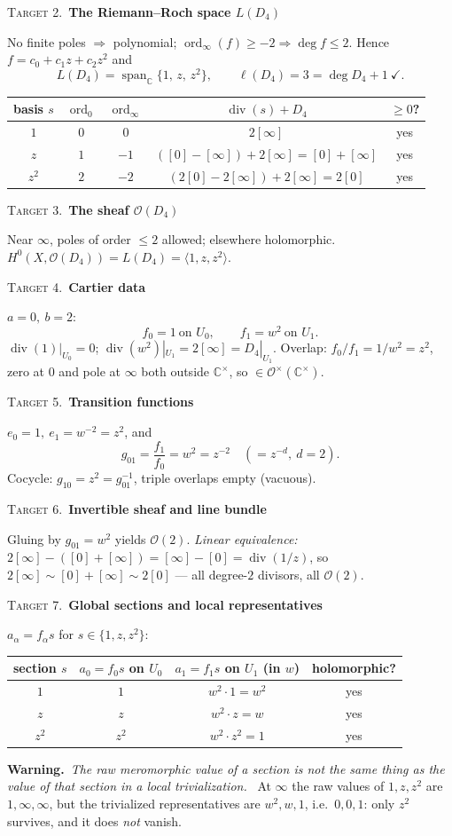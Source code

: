 \documentclass[11pt]{article}
\newcommand{\CC}{\mathbb C}
\newcommand{\OO}{\mathcal O}
\newcommand{\divisor}{\operatorname{div}}
\newcommand{\ord}{\operatorname{ord}}
\newcommand{\Span}{\operatorname{span}}
\newcommand{\target}[2]{\medskip\noindent%
  {\small\textsc{\textcolor{accent}{Target #1.}}}\ \textbf{\textcolor{inkblue}{#2}}\par\nopagebreak\smallskip}
\newcommand{\warningnote}{\par\smallskip\noindent%
  {\color{polered}\textbf{Warning.}}\ \emph{The raw meromorphic value of a section
  is not the same thing as the value of that section in a local trivialization.}\ }
\theoremstyle{plain}
\theoremstyle{definition}
\begin{document}
\target{2}{The Riemann--Roch space \(L(D_4)\)}
No finite poles $\Rightarrow$ polynomial; $\ord_\infty(f)\ge-2\Rightarrow\deg
f\le2$. Hence $f=c_0+c_1z+c_2z^2$ and
\[
  L(D_4)=\Span_\CC\{1,\,z,\,z^2\},\qquad \ell(D_4)=3=\deg D_4+1\ \checkmark.
\]
\begin{center}\small
\begin{tabular}{ccccc}
\toprule
basis $s$ & $\ord_0$ & $\ord_\infty$ & $\divisor(s)+D_4$ & $\ge0$?\\
\midrule
$1$   & $0$ & $0$  & $2[\infty]$                       & yes\\
$z$   & $1$ & $-1$ & $([0]-[\infty])+2[\infty]=[0]+[\infty]$ & yes\\
$z^2$ & $2$ & $-2$ & $(2[0]-2[\infty])+2[\infty]=2[0]$ & yes\\
\bottomrule
\end{tabular}
\end{center}

\target{3}{The sheaf \(\OO(D_4)\)}
Near $\infty$, poles of order $\le2$ allowed; elsewhere holomorphic.
$H^0(X,\OO(D_4))=L(D_4)=\langle1,z,z^2\rangle$.

\target{4}{Cartier data}
$a=0,\ b=2$:
\[
  f_0=1\ \text{on }U_0,\qquad f_1=w^{2}\ \text{on }U_1 .
\]
$\divisor(1)|_{U_0}=0$; $\divisor(w^2)|_{U_1}=2[\infty]=D_4|_{U_1}$. Overlap:
$f_0/f_1=1/w^2=z^2$, zero at $0$ and pole at $\infty$ both outside $\CC^\times$,
so $\in\OO^\times(\CC^\times)$.

\target{5}{Transition functions}
$e_0=1,\ e_1=w^{-2}=z^2$, and
\[
  g_{01}=\frac{f_1}{f_0}=w^{2}=z^{-2}\quad(=z^{-d},\ d=2).
\]
Cocycle: $g_{10}=z^2=g_{01}^{-1}$, triple overlaps empty (vacuous).

\target{6}{Invertible sheaf and line bundle}
Gluing by $g_{01}=w^2$ yields $\OO(2)$. \emph{Linear equivalence:}
$2[\infty]-([0]+[\infty])=[\infty]-[0]=\divisor(1/z)$, so $2[\infty]\sim[0]+[\infty]
\sim2[0]$ --- all degree-$2$ divisors, all $\OO(2)$.

\target{7}{Global sections and local representatives}
$a_\alpha=f_\alpha s$ for $s\in\{1,z,z^2\}$:
\begin{center}\small
\begin{tabular}{cccc}
\toprule
section $s$ & $a_0=f_0 s$ on $U_0$ & $a_1=f_1 s$ on $U_1$ (in $w$) & holomorphic?\\
\midrule
$1$   & $1$   & $w^2\cdot1=w^2$              & yes\\
$z$   & $z$   & $w^2\cdot z=w$               & yes\\
$z^2$ & $z^2$ & $w^2\cdot z^2=1$            & yes\\
\bottomrule
\end{tabular}
\end{center}
\warningnote
At $\infty$ the raw values of $1,z,z^2$ are $1,\infty,\infty$, but the trivialized
representatives are $w^2,w,1$, i.e.\ $0,0,1$: only $z^2$ survives, and it does
\emph{not} vanish.
\end{document}
